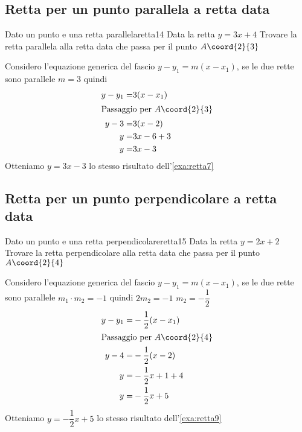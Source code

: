 \subsection{Retta per un punto parallela a retta data}
\begin{esempiot}{Dato un punto e una retta parallela}{retta14}
	Data la retta $y=3x+4$ Trovare la retta parallela alla retta data che  passa per il punto	$A\coord{2}{3}$
\end{esempiot}
Considero l'equazione generica del fascio $y-y_1=m(x-x_1)$, se le due rette sono parallele $m=3$ quindi
\begin{align*}
	y-y_1=&3(x-x_1)\\
	\intertext{Passaggio per $A\coord{2}{3}$}
	y-3=&3(x-2)\\
	y=&3x-6+3\\
	y=&3x-3\\
\end{align*}
Otteniamo 	$y=3x-3$ lo stesso risultato dell'\cref{exa:retta7}
\subsection{Retta per un punto perpendicolare a retta data}
\begin{esempiot}{Dato un punto e una retta perpendicolare}{retta15}
	Data la retta $y=2x+2$ Trovare la retta perpendicolare alla retta data che  passa per il punto	$A\coord{2}{4}$
\end{esempiot}
Considero l'equazione generica del fascio $y-y_1=m(x-x_1)$, se le due rette sono parallele $m_1\cdot m_2=-1$ quindi $2m_2=-1$ $m_2=-\dfrac{1}{2}$
\begin{align*}
	y-y_1=&-\dfrac{1}{2}(x-x_1)\\
	\intertext{Passaggio per $A\coord{2}{4}$}
	y-4=&-\dfrac{1}{2}(x-2)\\
	y=&-\dfrac{1}{2}x+1+4\\
	y=&-\dfrac{1}{2}x+5\\
\end{align*}
Otteniamo 	$y=-\dfrac{1}{2}x+5$ lo stesso risultato dell'\cref{exa:retta9}

